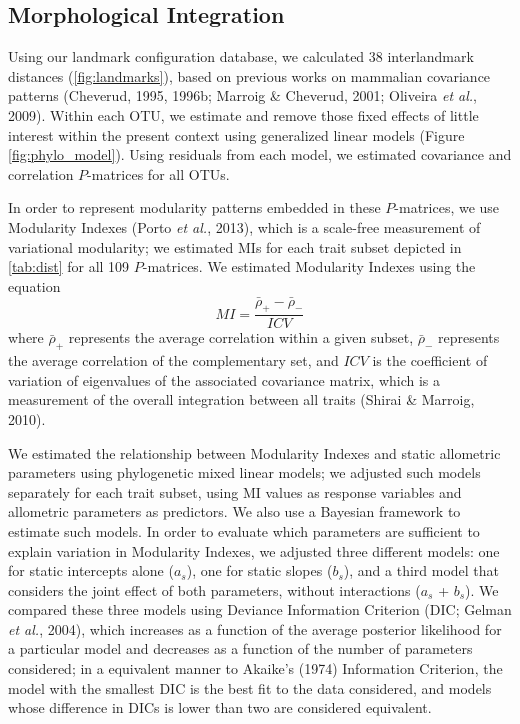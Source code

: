 \documentclass[12pt,twoside]{report}
\begin{document}
\subsection{Morphological Integration}\label{morphological-integration}

Using our landmark configuration database, we calculated 38
interlandmark distances (\autoref{fig:landmarks}), based on previous
works on mammalian covariance patterns (Cheverud, 1995, 1996b; Marroig
\& Cheverud, 2001; Oliveira \emph{et al.}, 2009). Within each OTU, we
estimate and remove those fixed effects of little interest within the
present context using generalized linear models (Figure
\ref{fig:phylo_model}). Using residuals from each model, we estimated
covariance and correlation $P$-matrices for all OTUs.

In order to represent modularity patterns embedded in these
$P$-matrices, we use Modularity Indexes (Porto \emph{et al.}, 2013),
which is a scale-free measurement of variational modularity; we
estimated MIs for each trait subset depicted in \autoref{tab:dist} for
all 109 $P$-matrices. We estimated Modularity Indexes using the equation
\[
MI = \frac {\bar{\rho}_{+} - \bar{\rho}_{-}} {ICV}
\] where $\bar{\rho}_{+}$ represents the average correlation within a
given subset, $\bar{\rho}_{-}$ represents the average correlation of the
complementary set, and $ICV$ is the coefficient of variation of
eigenvalues of the associated covariance matrix, which is a measurement
of the overall integration between all traits (Shirai \& Marroig, 2010).

We estimated the relationship between Modularity Indexes and static
allometric parameters using phylogenetic mixed linear models; we
adjusted such models separately for each trait subset, using MI values
as response variables and allometric parameters as predictors. We also
use a Bayesian framework to estimate such models. In order to evaluate
which parameters are sufficient to explain variation in Modularity
Indexes, we adjusted three different models: one for static intercepts
alone ($a_s$), one for static slopes ($b_s$), and a third model that
considers the joint effect of both parameters, without interactions
($a_s$ + $b_s$). We compared these three models using Deviance
Information Criterion (DIC; Gelman \emph{et al.}, 2004), which increases
as a function of the average posterior likelihood for a particular model
and decreases as a function of the number of parameters considered; in a
equivalent manner to Akaike's (1974) Information Criterion, the model
with the smallest DIC is the best fit to the data considered, and models
whose difference in DICs is lower than two are considered equivalent.
\end{document}
